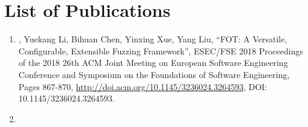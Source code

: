 \chapter{List of Publications} \label{paper}

\begin{enumerate}
\item \myname, Yuekang Li, Bihuan Chen, Yinxing Xue, Yang Liu, ``FOT: A Versatile, Configurable, Extensible Fuzzing Framework'', ESEC/FSE 2018 Proceedings of the 2018 26th ACM Joint Meeting on European Software Engineering Conference and Symposium on the Foundations of Software Engineering, Pages 867-870, \url{http://doi.acm.org/10.1145/3236024.3264593}, DOI: 10.1145/3236024.3264593.
\item 
\end{enumerate}
